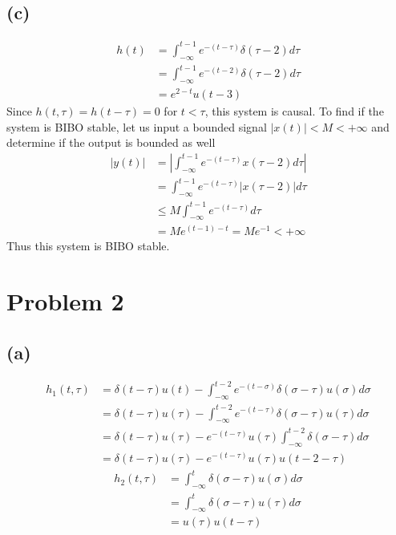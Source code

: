 \documentclass[12pt]{article}
\begin{document}
\subsection*{(c)}
\begin{align*}
h(t)&=\int_{-\infty}^{t-1}e^{-(t-\tau)}\delta(\tau-2)d\tau\\
&=\int_{-\infty}^{t-1}e^{-(t-2)}\delta(\tau-2)d\tau\\
&=e^{2-t}u(t-3)
\end{align*}
Since $h(t,\tau)=h(t-\tau)=0$ for $t<\tau$, this system is causal.
To find if the system is BIBO stable, let us input a bounded signal $|x(t)|<M<+\infty$ and determine if the output is bounded as well
\begin{align*}
|y(t)|&=\left|\int_{-\infty}^{t-1}e^{-(t-\tau)}x(\tau-2)d\tau\right|\\
&=\int_{-\infty}^{t-1}e^{-(t-\tau)}|x(\tau-2)|d\tau\\
&\leq M\int_{-\infty}^{t-1}e^{-(t-\tau)}d\tau\\
&=M e^{(t-1)-t}=Me^{-1}<+\infty
\end{align*}
Thus this system is BIBO stable.
\section*{Problem 2}
\subsection*{(a)}
\begin{align*}
h_1(t,\tau)&=\delta(t-\tau)u(t)-\int_{-\infty}^{t-2}e^{-(t-\sigma)}\delta(\sigma-\tau)u(\sigma)d\sigma\\
&=\delta(t-\tau)u(\tau)-\int_{-\infty}^{t-2}e^{-(t-\tau)}\delta(\sigma-\tau)u(\tau)d\sigma\\
&=\delta(t-\tau)u(\tau)-e^{-(t-\tau)}u(\tau)\int_{-\infty}^{t-2}\delta(\sigma-\tau)d\sigma\\
&=\boxed{\delta(t-\tau)u(\tau)-e^{-(t-\tau)}u(\tau)u(t-2-\tau)}
\end{align*}
\begin{align*}
h_2(t,\tau)&=\int_{-\infty}^{t}\delta(\sigma-\tau)u(\sigma)d\sigma\\
&=\int_{-\infty}^{t}\delta(\sigma-\tau)u(\tau)d\sigma\\
&=\boxed{u(\tau)u(t-\tau)}
\end{align*}
\end{document}
